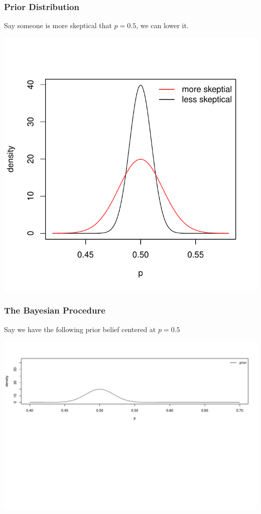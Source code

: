 \documentclass[handout]{beamer}
\begin{document}
\begin{frame}
\frametitle{Prior Distribution}
Say someone is more skeptical that $p=0.5$, we can lower it.  

\begin{center}
\includegraphics[height=0.7\textheight]{figure/prior2.pdf} 
\end{center}

\end{frame}



\begin{frame}
\frametitle{The Bayesian Procedure}
Say we have the following prior belief centered at $p=0.5$
\begin{center}
\includegraphics[width=\textwidth]{figure/bayes1.pdf} 
\end{center}

\end{frame}
\end{document}
